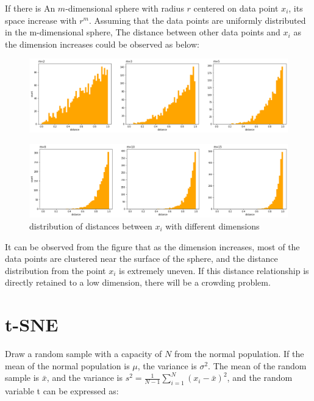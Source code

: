 \noindent If there is An $m$-dimensional sphere with radius $r$ centered on data point $x_i$, its space increase with $r^m$. Assuming that the data points are uniformly distributed in the m-dimensional sphere, The distance between other data points and $x_i$ as the dimension increases could be observed as below:

\begin{figure}[ht]

\centering
\includegraphics[scale=0.34]{images/image_crowding_problem_1.png}
\label{fig:label}


\centering
\includegraphics[scale=0.34]{images/image_crowding_problem_2.png}
\caption{distribution of distances between $x_i$ with different dimensions}
\label{fig:label}
\end{figure}

\noindent It can be observed from the figure that as the dimension increases, most of the data points are clustered near the surface of the sphere, and the distance distribution from the point $x_i$ is extremely uneven. If this distance relationship is directly retained to a low dimension, there will be a crowding problem.

\section{t-SNE}
Draw a random sample with a capacity of $N$ from the normal population. If the mean of the normal population is $μ$, the variance is $\sigma^2$. The mean of the random sample is $\bar{x}$, and the variance is $s^2=  \frac {1}{N−1} \sum ^N_{i=1} (x_i−\bar{x})^2$, and the random variable t can be expressed as:

